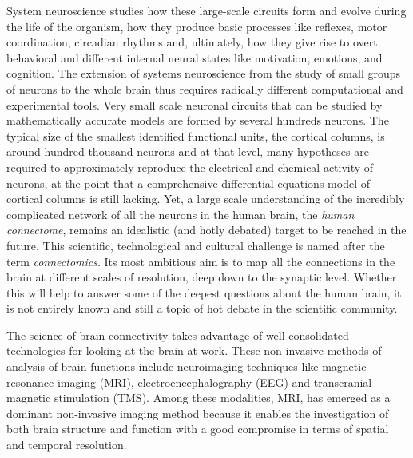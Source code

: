 System neuroscience studies how these large-scale circuits form and evolve during the life of the organism, how they produce basic processes like reflexes, motor coordination, circadian rhythms and, ultimately, how they give rise to overt behavioral and different internal neural states like motivation, emotions, and cognition.
The extension of systems neuroscience from the study of small groups of neurons to the whole brain thus requires radically different computational and experimental tools.
Very small scale neuronal circuits that can be studied by mathematically accurate models are formed by several hundreds neurons. The typical size of the smallest identified functional units, the cortical columns, is around hundred thousand neurons and at that level, many hypotheses are required to approximately reproduce the electrical and chemical activity of neurons, at the point that a comprehensive differential equations model of cortical columns is still lacking. 
Yet, a large scale understanding of the incredibly complicated network of all the neurons in the human brain, the \emph{human connectome}, remains an idealistic (and hotly debated) target to be reached in the future. This scientific, technological and cultural challenge is named after the term \emph{connectomics}. Its most ambitious aim is to map all the connections in the brain at different scales of resolution, deep down to the synaptic level. Whether this will help to answer some of the deepest questions about the human brain, it is not entirely known and still a topic of hot debate in the scientific community.

The science of brain connectivity takes advantage of well-consolidated technologies for looking at the brain at work. These non-invasive methods of analysis of brain functions include neuroimaging techniques like magnetic resonance imaging (MRI), electroencephalography (EEG) and transcranial magnetic stimulation (TMS).
Among these modalities, MRI, has emerged as a dominant non-invasive imaging method because it enables the investigation of both brain structure and function with a good compromise in terms of spatial and temporal resolution.

